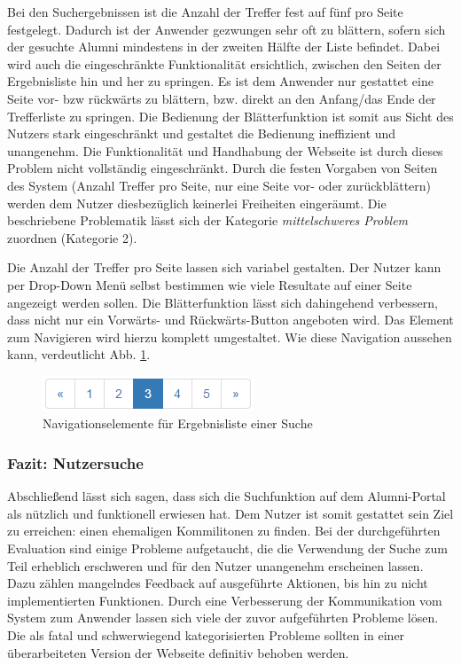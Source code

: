 {
	Bei den Suchergebnissen ist die Anzahl der Treffer fest auf fünf pro Seite festgelegt. Dadurch ist der Anwender gezwungen sehr oft zu blättern, sofern sich der gesuchte Alumni mindestens in der zweiten Hälfte der Liste befindet. Dabei wird auch die eingeschränkte Funktionalität ersichtlich, zwischen den Seiten der Ergebnisliste hin und her zu springen. Es ist dem Anwender nur gestattet eine Seite vor- bzw rückwärts zu blättern, bzw. direkt an den Anfang/das Ende der Trefferliste zu springen. Die Bedienung der Blätterfunktion ist somit aus Sicht des Nutzers stark eingeschränkt und gestaltet die Bedienung ineffizient und unangenehm.
}
{
	Die Funktionalität und Handhabung der Webseite ist durch dieses Problem nicht vollständig eingeschränkt. Durch die festen Vorgaben von Seiten des System (Anzahl Treffer pro Seite, nur eine Seite vor- oder zurückblättern) werden dem Nutzer diesbezüglich keinerlei Freiheiten eingeräumt. Die beschriebene Problematik lässt sich der Kategorie \emph{mittelschweres Problem} zuordnen (Kategorie 2).
}
{
	Die Anzahl der Treffer pro Seite lassen sich variabel gestalten. Der Nutzer kann per Drop-Down Menü selbst bestimmen wie viele Resultate auf einer Seite angezeigt werden sollen. Die Blätterfunktion lässt sich dahingehend verbessern, dass nicht nur ein Vorwärts- und Rückwärts-Button angeboten wird. Das Element zum Navigieren wird hierzu komplett umgestaltet. Wie diese Navigation aussehen kann, verdeutlicht Abb. \ref{fig:suche:pagination}.
	
	\begin{figure}[h]
		\centering
		\includegraphics[scale=0.75]{figures/pagination.png}
		\caption{Navigationselemente für Ergebnisliste einer Suche}
		\label{fig:suche:pagination}
	\end{figure}
}
\label{prob:suche:trefferanzahl}

\subsubsection*{Fazit: Nutzersuche}
Abschließend lässt sich sagen, dass sich die Suchfunktion auf dem Alumni-Portal als nützlich und funktionell erwiesen hat. Dem Nutzer ist somit gestattet sein Ziel zu erreichen: einen ehemaligen Kommilitonen zu finden. Bei der durchgeführten Evaluation sind einige Probleme aufgetaucht, die die Verwendung der Suche zum Teil erheblich erschweren und für den Nutzer unangenehm erscheinen lassen. Dazu zählen mangelndes Feedback auf ausgeführte Aktionen, bis hin zu nicht implementierten Funktionen. Durch eine Verbesserung der Kommunikation vom System zum Anwender lassen sich viele der zuvor aufgeführten Probleme lösen. Die als fatal und schwerwiegend kategorisierten Probleme sollten in einer überarbeiteten Version der Webseite definitiv behoben werden.
